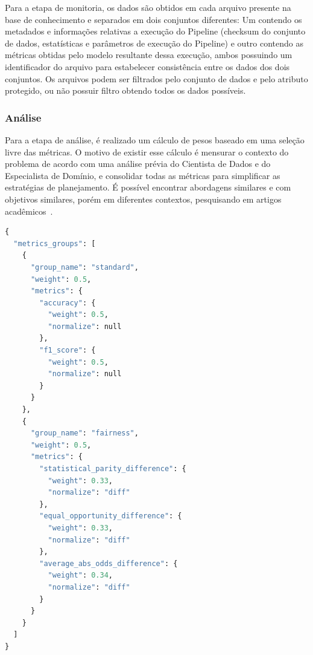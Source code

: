 \documentclass[portugues]{ic-tese}
\begin{document}
Para a etapa de monitoria, os dados são obtidos em cada arquivo presente na base de conhecimento e separados em dois conjuntos diferentes: Um contendo os metadados e informações relativas a execução do Pipeline (checksum do conjunto de dados, estatísticas e parâmetros de execução do Pipeline) e outro contendo as métricas obtidas pelo modelo resultante dessa execução, ambos possuindo um identificador do arquivo para estabelecer consistência entre os dados dos dois conjuntos. Os arquivos podem ser filtrados pelo conjunto de dados e pelo atributo protegido, ou não possuir filtro obtendo todos os dados possíveis.

\subsubsection{Análise}

Para a etapa de análise, é realizado um cálculo de pesos baseado em uma seleção livre das métricas. O motivo de existir esse cálculo é mensurar o contexto do problema de acordo com uma análise prévia do Cientista de Dados e do Especialista de Domínio, e consolidar todas as métricas para simplificar as estratégias de planejamento. É possível encontrar abordagens similares e com objetivos similares, porém em diferentes contextos, pesquisando em artigos acadêmicos~\citep{Konstantinou_2017}.

\begin{lstlisting}[language=Python, caption={Exemplo de arquivo contendo informações sobre as métricas, grupos e seus respectivos pesos},label=cod:MetricsWeights]
{
  "metrics_groups": [
    {
      "group_name": "standard",
      "weight": 0.5,
      "metrics": {
        "accuracy": {
          "weight": 0.5,
          "normalize": null
        },
        "f1_score": {
          "weight": 0.5,
          "normalize": null
        }
      }
    },
    {
      "group_name": "fairness",
      "weight": 0.5,
      "metrics": {
        "statistical_parity_difference": {
          "weight": 0.33,
          "normalize": "diff"
        },
        "equal_opportunity_difference": {
          "weight": 0.33,
          "normalize": "diff"
        },
        "average_abs_odds_difference": {
          "weight": 0.34,
          "normalize": "diff"
        }
      }
    }
  ]
}
\end{lstlisting}
\end{document}
